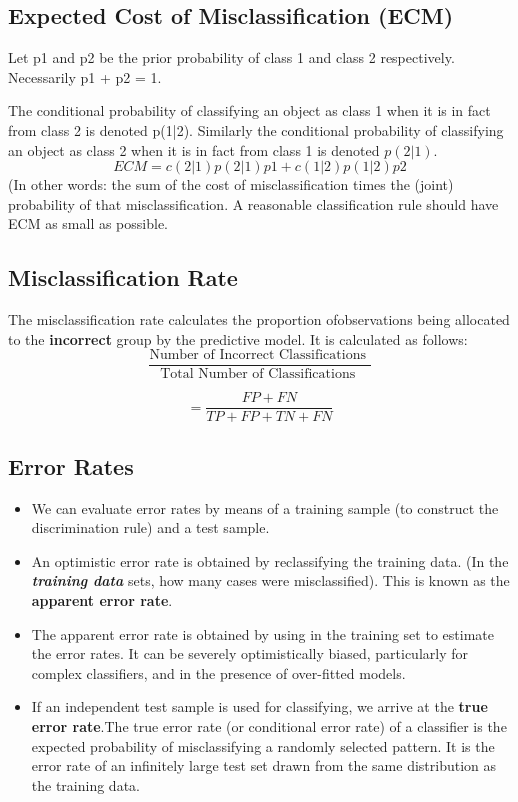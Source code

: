 \documentclass[a4paper,12pt]{article}
\begin{document}
\subsection*{ Expected Cost of Misclassification (ECM)}
Let p1 and p2 be the prior probability of class 1 and class 2 respectively.
Necessarily p1 + p2 = 1.

The conditional probability of classifying an object as class 1 when it is
in fact from class 2 is denoted p(1|2). Similarly the conditional probability
of classifying an object as class 2 when it is in fact from class 1 is denoted
$p(2|1)$.
\[ ECM = c(2|1)p(2|1)p1 + c(1|2)p(1|2)p2\]
(In other words: the sum of the cost of misclassification times the (joint)
probability of that misclassification.
A reasonable classification rule should have ECM as small as possible.
\subsection*{Misclassification Rate}
The misclassification rate calculates the proportion ofobservations being allocated to the \textbf{incorrect} group by the predictive model. It is calculated as follows:
\[ \frac{
	\mbox{Number of Incorrect Classifications }}{\mbox{Total Number of Classifications }} \]

\[ = \frac{FP + FN}{TP+FP+TN+FN}\]


\subsection*{Error Rates}
\begin{itemize}
\item We can evaluate error rates by means of a training sample (to construct the discrimination rule) and a test sample.

\item 
An optimistic error rate is obtained by reclassifying the training data. (In the \textbf{\textit{training data}} sets, how many cases were misclassified). This is known as the \textbf{apparent error rate}.

\item 
The apparent error rate is obtained by using in the training set to estimate
the error rates. It can be severely optimistically biased, particularly for complex classifiers, and in the presence of over-fitted models.

\item
If an independent test sample is used for classifying, we arrive at the  \textbf{true error rate}.The true error rate (or conditional error rate) of a classifier is the expected
probability of misclassifying a randomly selected pattern.
It is the error rate of an infinitely large test set drawn from the same distribution as the training data.

\end{itemize}
\end{document}

